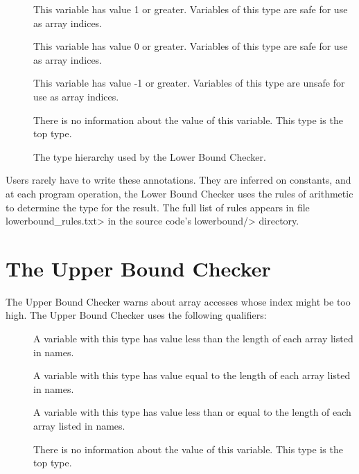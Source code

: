 \begin{description}
\item[]
  This variable has value 1 or greater.
  Variables of this type are safe for use as array indices.
\item[]
  This variable has value 0 or greater.
  Variables of this type are safe for use as array indices.
\item[]
  This variable has value -1 or greater.
  Variables of this type are unsafe for use as array indices.
\item[]
  There is no information about the value of this variable.
  This type is the top type.
\end{description}

\begin{figure}
\caption{The type hierarchy used by the Lower Bound Checker.}
\label{fig-lowerbound-types}
\end{figure}

Users rarely have to write these annotations.  They are inferred on
constants, and at each program operation, the Lower Bound
Checker uses the rules of arithmetic to determine the type for the result.
The full list of rules appears in file \<lowerbound\_rules.txt> in the
source code's \<lowerbound/> directory.

\section{The Upper Bound Checker\label{index-upperbound}}

The Upper Bound Checker warns about array accesses whose index might be
too high. The Upper Bound Checker uses the following
qualifiers:

\begin{description}
\item[]
  A variable with this type
  has value less than the length of each array listed in names.
\item[]
  A variable with this type
  has value equal to the length of each array listed in names.
\item[]
  A variable with this type
  has value less than or equal to the length of each array listed in names.
\item[]
  There is no information about the value of this variable.
  This type is the top type.
\end{description}
